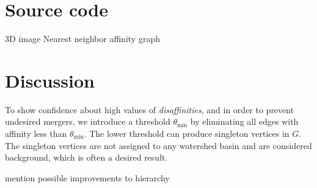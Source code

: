 \documentclass{article}
\begin{document}
\section{Source code}
3D image
Nearest neighbor affinity graph 

\section{Discussion}
To show confidence about high values of \emph{disaffinities}, and in
order to prevent undesired mergers, we introduce a threshold
$\theta_{\min}$ by eliminating all edges with affinity less than
$\theta_{\min}$. The lower threshold can produce singleton vertices in
$G$. The singleton vertices are not assigned to any watershed basin
and are considered background, which is often a desired result.

mention possible improvements to hierarchy



{\small


}
\end{document}
